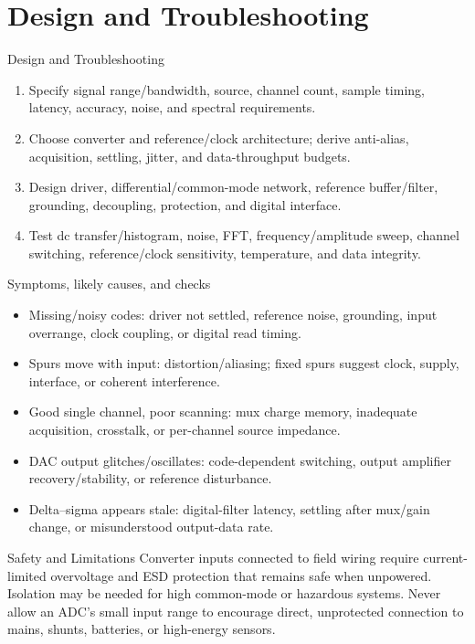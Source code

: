 \documentclass[10pt,letterpaper]{article}
\begin{document}
\section{Design and Troubleshooting}
\begin{CornellExamBox}{Design and Troubleshooting}
\begin{enumerate}
  \item Specify signal range/bandwidth, source, channel count, sample timing, latency, accuracy, noise, and spectral requirements.
  \item Choose converter and reference/clock architecture; derive anti-alias, acquisition, settling, jitter, and data-throughput budgets.
  \item Design driver, differential/common-mode network, reference buffer/filter, grounding, decoupling, protection, and digital interface.
  \item Test dc transfer/histogram, noise, FFT, frequency/amplitude sweep, channel switching, reference/clock sensitivity, temperature, and data integrity.
\end{enumerate}\end{CornellExamBox}
\begin{CornellExamBox}{Symptoms, likely causes, and checks}
\begin{itemize}
  \item Missing/noisy codes: driver not settled, reference noise, grounding, input overrange, clock coupling, or digital read timing.
  \item Spurs move with input: distortion/aliasing; fixed spurs suggest clock, supply, interface, or coherent interference.
  \item Good single channel, poor scanning: mux charge memory, inadequate acquisition, crosstalk, or per-channel source impedance.
  \item DAC output glitches/oscillates: code-dependent switching, output amplifier recovery/stability, or reference disturbance.
  \item Delta--sigma appears stale: digital-filter latency, settling after mux/gain change, or misunderstood output-data rate.
\end{itemize}\end{CornellExamBox}
\begin{CornellWarningBox}{Safety and Limitations}
Converter inputs connected to field wiring require current-limited overvoltage and ESD protection that remains safe when unpowered. Isolation may be needed for high common-mode or hazardous systems. Never allow an ADC's small input range to encourage direct, unprotected connection to mains, shunts, batteries, or high-energy sensors.
\end{CornellWarningBox}
\end{document}
